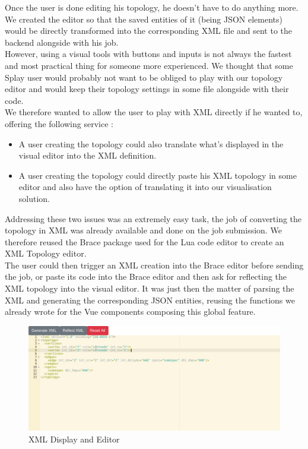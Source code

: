 \documentclass{eplmastersthesis}
\begin{document}
          Once the user is done editing his topology, he doesn't have to
          do anything more. We created the editor so that the saved entities
          of it (being JSON elements) would be directly transformed into the
          corresponding XML file and sent to the backend alongside with his
          job.\\

          However, using a visual tools with buttons and inputs is not always
          the fastest and most practical thing for someone more experienced. We
          thought that some Splay user would probably not want to be obliged
          to play with our topology editor and would keep their topology
          settings in some file alongside with their code.\\
          We therefore wanted to allow the user to play with XML directly
          if he wanted to, offering the following service :

          \begin{itemize}
            \item A user creating the topology could also translate what's
            displayed in the visual editor into the XML definition.
            \item A user creating the topology could directly paste
            his XML topology in some editor and also have the option of
            translating it into our visualisation solution.
          \end{itemize}

          Addressing these two issues was an extremely easy task, the job of
          converting the topology in XML was already available and done on
          the job submission. We therefore reused the Brace package used
          for the Lua code editor to create an XML Topology editor.\\
          The user could then trigger an XML creation into the Brace editor
          before sending the job, or paste its code into the Brace editor and
          then ask for reflecting the XML topology into the visual editor. It
          was just then the matter of parsing the XML and generating the
          corresponding JSON entities, reusing the functions we already wrote
          for the Vue components composing this global feature.

          \begin{figure}[H]
            \centering
            \includegraphics[scale=0.5]{figures/xml_topology.png}
            \caption{\label{xml_topology} XML Display and Editor}
          \end{figure}
\end{document}
